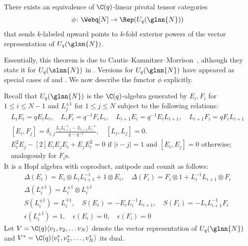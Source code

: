 \begin{theo}\label{thm:CKM} There exists an equivalence of $\C(q)$-linear pivotal tensor categories
\[\phi \colon \Webq[N] \to \Rep(U_q(\glnn{N}))\]
that sends $k$-labeled upward points to $k$-fold exterior powers of the vector representation of $U_q(\glnn{N})$.
\end{theo}
Essentially, this theorem is due to Cautis--Kamnitzer--Morrison~\cite{CKM},
although they state it for $U_q(\slnn{N})$ in \cite[Theorem 3.3.1]{CKM}.
Versions for $U_q(\glnn{N})$ have appeared as special cases of \cite[Main Theorem A]{QS2} and \cite[Theorem 3.20]{TVW}. We now describe the functor $\phi$
explicitly.

Recall that $U_q(\glnn{N})$ is the $\C(q)$-algebra generated by $E_i,F_i$ for $1\leq i \leq N-1$ and $L^{\pm 1}_j$ for $1\leq j \leq N$ subject to the following relations:
\begin{gather}
L_i E_i=q E_i L_i,\quad L_iF_i=q^{-1}F_iL_i,\quad L_{i+1} E_i=q^{-1} E_iL_{i+1},\quad L_{i+1}F_i=q F_i L_{i+1}
\\
[E_i,F_j]=\delta_{i,j} \frac{L_iL_{i+1}^{-1}-L_{i+1}L_{i}^{-1}}{q-q^{-1}},\quad [L_i,L_j]=0.
\\
E_i^2 E_j -[2] E_i E_j E_i + E_j E_i^2 =0 \text{ if } |i-j|=1  \text{ and } [E_i,E_j]=0 \text{ otherwise;}
\\
\text{analogously for $F_i$s}. \nonumber
\end{gather}
It is a Hopf algebra with coproduct, antipode and counit as follows:
\begin{gather*}
  \Delta(E_i)=E_i\otimes L_iL_{i+1}^{-1} +1\otimes E_i, \quad \Delta(F_i)=F_i\otimes 1 +L_i^{-1}L_{i+1}\otimes F_i \\
  \Delta(L_i^{\pm 1})=L_i^{\pm 1}\otimes L_i^{\pm 1}\\
S(L_i^{\pm 1})=L_i^{\mp 1}, \quad S(E_i)=-E_i L_i^{-1}L_{i+1}, \quad S(F_i)= - L_iL_{i+1}^{-1}F_i \\
\epsilon(L_i^{\pm 1})= 1, \quad \epsilon(E_i)=0, \quad \epsilon(F_i)=0
\end{gather*}
Let $V=\C(q)\langle v_1,v_2,\dots v_N\rangle$ denote the vector representation of $U_q(\glnn{N})$ and $V^*=\C(q)\langle v_1^*,v_2^*,\dots,v_N^* \rangle$ its dual. 

